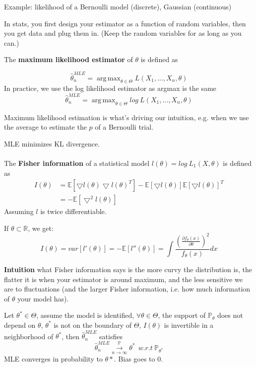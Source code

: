 \documentclass{article}
\DeclareMathOperator*{\argmax}{arg\,max}
\begin{document}
Example: likelihood of a Bernoulli model (discrete), Gaussian (continuous)

In stats, you first design your estimator as a function of random variables, then you get data and plug them in.
(Keep the random variables for as long as you can.)

The \textbf{maximum likelihood estimator} of $\theta$ is defined as

$$
\hat{\theta}^{MLE}_n = \argmax_{\theta \in \Theta} L(X_1, \dots, X_n, \theta)
$$
In practice, we use the log likelihood estimator as argmax is the same
$$
\hat{\theta}^{MLE}_n = \argmax_{\theta \in \Theta} log ~ L(X_1, \dots, X_n, \theta)
$$

Maximum likelihood estimation is what's driving our intuition, e.g. when we use the average to estimate the $p$ of a Bernoulli trial.

MLE minimizes KL divergence.
\\
\\
The \textbf{Fisher information} of a statistical model $l(\theta) = log ~ L_1(X, \theta)$ is defined as
\begin{align*}
I(\theta) &= \mathbb{E}[\bigtriangledown l(\theta) \bigtriangledown l(\theta)^T] - \mathbb{E}[\bigtriangledown l(\theta)] \mathbb{E}[\bigtriangledown l(\theta)]^T \\
          &= - \mathbb{E}[\bigtriangledown^2 l(\theta)]
\end{align*}
Assuming $l$ is twice differentiable.

If $\theta \subset \mathbb{R}$, we get:
$$
I(\theta) = var[l'(\theta)] = - \mathbb{E}[l''(\theta)] = \int \frac{(\frac{\partial{f_{\theta}(x)}}{\partial \theta})^2}{f_{\theta}(x)} dx
$$

\textbf{Intuition} what Fisher information says is the more curvy the distribution is, the flatter it is when your estimator is around maximum, and the less sensitive we are to fluctuations (and the larger Fisher information, i.e. how much information of $\theta$ your model has).

Let $\theta^* \in \Theta$, assume the model is identified, $\forall \theta \in \Theta$, the support of $\mathbb{P}_{\theta}$ does not depend on $\theta$, $\theta^*$ is not on the boundary of $\Theta$, $I(\theta)$ is invertible in a neighborhood of $\theta^*$, then
$\hat{\theta}^{MLE}_{n}$ satisfies
$$
\hat{\theta}^{MLE}_{n} \overset{\mathbb{P}}{\underset{n \to \infty}{\longrightarrow}} \theta^* ~ ~ w.r.t ~ \mathbb{P}_{\theta^*}
$$
MLE converges in probability to $\theta*$. Bias goes to 0.
\end{document}
